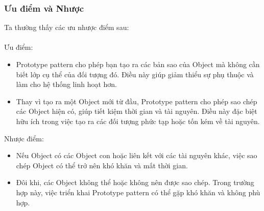 \subsubsection{Ưu điểm và Nhược }
Ta thường thấy các ưu nhược điểm sau:\\\\
Ưu điểm:
\begin{itemize}
    \item Prototype pattern cho phép bạn tạo ra các bản sao của Object mà không cần biết lớp cụ thể của đối tượng đó. Điều này giúp giảm thiểu sự phụ thuộc và làm cho hệ thống linh hoạt hơn.
    \item Thay vì tạo ra một Object mới từ đầu, Prototype pattern cho phép sao chép các Object hiện có, giúp tiết kiệm thời gian và tài nguyên. Điều này đặc biệt hữu ích trong việc tạo ra các đối tượng phức tạp hoặc tốn kém về tài nguyên.
\end{itemize}
Nhược điểm:
\begin{itemize}
    \item  Nếu Object có các Object con hoặc liên kết với các tài nguyên khác, việc sao chép Object có thể trở nên khó khăn và mất thời gian.
    \item Đôi khi, các Object không thể hoặc không nên được sao chép. Trong trường hợp này, việc triển khai Prototype pattern có thể gặp khó khăn và không phù hợp.
\end{itemize}
